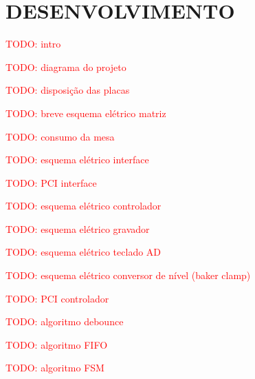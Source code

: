 
\chapter{DESENVOLVIMENTO}
\label{chap:metodologia}

\textcolor{red}{TODO: intro}

\textcolor{red}{TODO: diagrama do projeto}

\textcolor{red}{TODO: disposição das placas}

\textcolor{red}{TODO: breve esquema elétrico matriz}

\textcolor{red}{TODO: consumo da mesa}

\textcolor{red}{TODO: esquema elétrico interface}

\textcolor{red}{TODO: PCI interface}

\textcolor{red}{TODO: esquema elétrico controlador}

\textcolor{red}{TODO: esquema elétrico gravador}

\textcolor{red}{TODO: esquema elétrico teclado AD}

\textcolor{red}{TODO: esquema elétrico conversor de nível (baker clamp)}

\textcolor{red}{TODO: PCI controlador}

\textcolor{red}{TODO: algoritmo debounce}

\textcolor{red}{TODO: algoritmo FIFO}

\textcolor{red}{TODO: algoritmo FSM}

